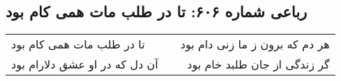 \begin{center}
\section*{رباعی شماره ۶۰۶: تا در طلب مات همی کام بود}
\label{sec:0606}
\begin{longtable}{l p{0.5cm} r}
تا در طلب مات همی کام بود
&&
هر دم که برون ز ما زنی دام بود
\\
آن دل که در او عشق دلارام بود
&&
گر زندگی از جان طلبد خام بود
\\
\end{longtable}
\end{center}
